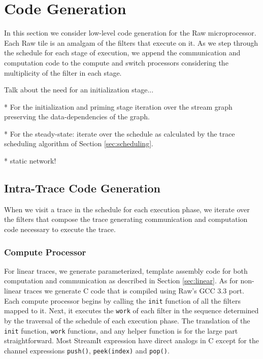 \section{Code Generation}
\label{sec:codegen}
In this section we consider low-level code generation for the Raw
microprocessor. Each Raw tile is an amalgam of the filters that
execute on it. As we step through the schedule for each stage of
execution, we append the communication and computation code to the
compute and switch processors considering the multiplicity of the
filter in each stage.

Talk about the need for an initialization stage...

* For the initialization and priming stage iteration over the stream
graph preserving the data-dependencies of the graph.

* For the steady-state: iterate over the schedule as calculated by the trace scheduling
algorithm of Section \ref{sec:scheduling}.

* static network!

\subsection{Intra-Trace Code Generation}
When we visit a trace in the schedule for each execution phase, we
iterate over the filters that compose the trace generating 
communication and computation code necessary to execute the trace.

\subsubsection{Compute Processor}
For linear traces, we generate parameterized, template assembly code
for both computation and communication as described in Section
\ref{sec:linear}.  As for non-linear traces we generate C code that is
compiled using Raw's GCC 3.3 port.  Each compute processor begins by
calling the {\tt init} function of all the filters mapped to it.  Next,
it executes the {\tt work} of each filter in the sequence determined
by the traversal of the schedule of each execution phase.
The translation of the {\tt init} function, {\tt work} functions, and
any helper function is for the large part straightforward.  Most
StreamIt expression have direct analogs in C except for the channel
expressions {\tt push()}, {\tt peek(index)} and {\tt pop()}.

